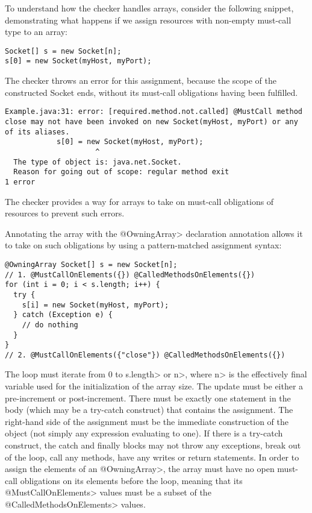 To understand how the checker handles arrays, consider the following snippet, demonstrating what happens if we assign resources with non-empty must-call type to an array:

\begin{verbatim}
Socket[] s = new Socket[n];
s[0] = new Socket(myHost, myPort);
\end{verbatim}

The checker throws an error for this assignment, because the scope of the constructed Socket ends, without its must-call obligations having been fulfilled.

\begin{verbatim}
Example.java:31: error: [required.method.not.called] @MustCall method close may not have been invoked on new Socket(myHost, myPort) or any of its aliases.
            s[0] = new Socket(myHost, myPort);
                     ^
  The type of object is: java.net.Socket.
  Reason for going out of scope: regular method exit
1 error
\end{verbatim}

The checker provides a way for arrays to take on  must-call obligations of resources to prevent such errors.

Annotating the array with the \<@OwningArray> declaration annotation allows it to take on such obligations by using a pattern-matched assignment syntax:

\begin{verbatim}
@OwningArray Socket[] s = new Socket[n];
// 1. @MustCallOnElements({}) @CalledMethodsOnElements({})
for (int i = 0; i < s.length; i++) {
  try {
    s[i] = new Socket(myHost, myPort);
  } catch (Exception e) {
    // do nothing
  }
}
// 2. @MustCallOnElements({"close"}) @CalledMethodsOnElements({})
\end{verbatim}
The loop must iterate from 0 to \<s.length> or \<n>, where \<n> is the effectively final variable used for the initialization of the array size. The update must be either a pre-increment or post-increment.  There must be exactly one statement in the body (which may be a try-catch construct) that contains the assignment. The right-hand side of the assignment must be the immediate construction of the object (not simply any expression evaluating to one). If there is a try-catch construct, the catch and finally blocks may not throw any exceptions, break out of the loop, call any methods, have any writes or return statements. In order to assign the elements of an \<@OwningArray>, the array must have no open must-call obligations on its elements before the loop, meaning that its \<@MustCallOnElements> values must be a subset of the \<@CalledMethodsOnElements> values.

